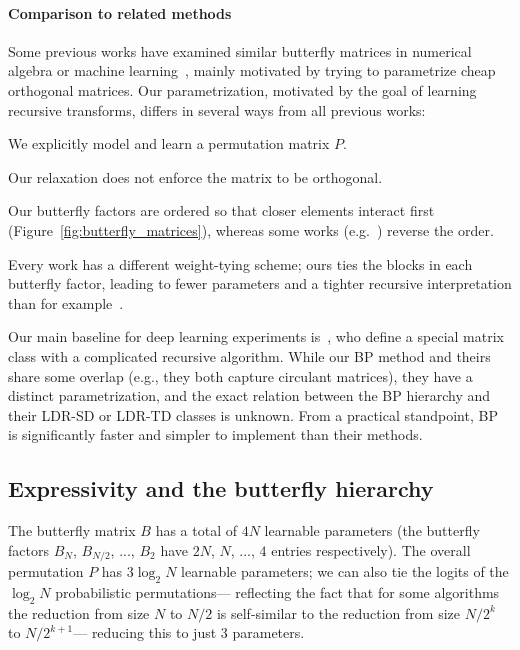 \paragraph{Comparison to related methods} Some previous works have examined similar butterfly matrices in numerical algebra or machine learning~\citep{parker1995random,jing2017tunable,munkhoeva2018quadrature}, mainly motivated by trying to parametrize cheap orthogonal matrices. Our parametrization, motivated by the goal of learning recursive transforms, differs in several ways from all previous works:

\begin{enumerate*}[label=\arabic*.]
  \item We explicitly model and learn a permutation matrix $P$.
  \item Our relaxation does not enforce the matrix to be orthogonal.
  \item Our butterfly factors are ordered so that closer elements interact first
  (Figure~\ref{fig:butterfly_matrices}), whereas some works (e.g.\ \citep{munkhoeva2018quadrature}) reverse the order.
  \item Every work has a different weight-tying scheme; ours ties the blocks in each butterfly factor, leading to fewer parameters and a tighter recursive interpretation than for example~\citep{jing2017tunable}.
\end{enumerate*}

  Our main baseline for deep learning experiments is~\citet{thomas2018learning}, who define a special matrix class with a complicated recursive algorithm. While our BP method and theirs share some overlap (e.g., they both capture circulant matrices), they have a distinct parametrization, and the exact relation between the BP hierarchy and their LDR-SD or LDR-TD classes is unknown. From a practical standpoint, BP is significantly faster and simpler to implement than their methods.
\subsection{Expressivity and the butterfly hierarchy}

The butterfly matrix $B$ has a total of $4N$ learnable parameters (the butterfly factors $B_N$, $B_{N/2}$, ..., $B_2$ have $2N$, $N$, ..., $4$ entries respectively). The overall permutation $P$ has $3\log_2 N$ learnable parameters; we can also tie the logits of the $\log_2 N$ probabilistic permutations--- reflecting the fact that for some algorithms the reduction from size $N$ to $N/2$ is self-similar to the reduction from size $N/2^k$ to $N/2^{k+1}$--- reducing this to just $3$ parameters.


